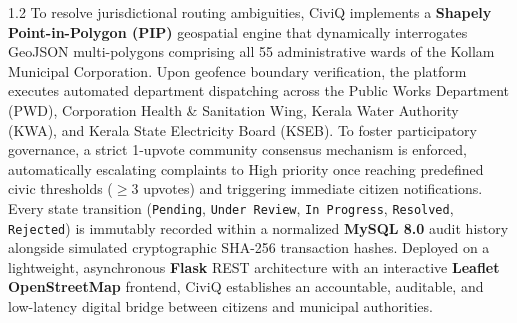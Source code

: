 \begin{spacing}{1.2}
\noindent To resolve jurisdictional routing ambiguities, CiviQ implements a \textbf{Shapely Point-in-Polygon (PIP)} geospatial engine that dynamically interrogates GeoJSON multi-polygons comprising all 55 administrative wards of the Kollam Municipal Corporation. Upon geofence boundary verification, the platform executes automated department dispatching across the Public Works Department (PWD), Corporation Health \& Sanitation Wing, Kerala Water Authority (KWA), and Kerala State Electricity Board (KSEB). To foster participatory governance, a strict 1-upvote community consensus mechanism is enforced, automatically escalating complaints to High priority once reaching predefined civic thresholds ($\ge 3$ upvotes) and triggering immediate citizen notifications. Every state transition (\texttt{Pending}, \texttt{Under Review}, \texttt{In Progress}, \texttt{Resolved}, \texttt{Rejected}) is immutably recorded within a normalized \textbf{MySQL 8.0} audit history alongside simulated cryptographic SHA-256 transaction hashes. Deployed on a lightweight, asynchronous \textbf{Flask} REST architecture with an interactive \textbf{Leaflet OpenStreetMap} frontend, CiviQ establishes an accountable, auditable, and low-latency digital bridge between citizens and municipal authorities.
\end{spacing}

\thispagestyle{plain}
